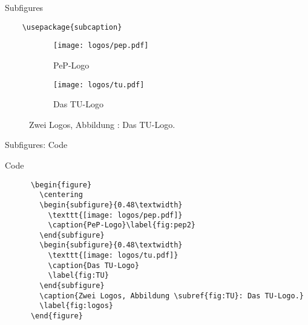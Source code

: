\begin{frame}[fragile]{Subfigures}
  \begin{Packages}
    \begin{lstlisting}
    \usepackage{subcaption}
    \end{lstlisting}
  \end{Packages}
      \begin{figure}
        \centering
        \begin{subfigure}{0.48\textwidth}
          \texttt{[image: logos/pep.pdf]}
          \caption{PeP-Logo}\label{fig:pep2}
        \end{subfigure}
        \begin{subfigure}{0.48\textwidth}
          \texttt{[image: logos/tu.pdf]}
          \caption{Das TU-Logo}\label{fig:TU}
        \end{subfigure}
        \caption{Zwei Logos, Abbildung : Das TU-Logo.}\label{fig:logos}
      \end{figure}
\end{frame}

\begin{frame}[fragile]{Subfigures: Code}
  \begin{block}{Code}
    \begin{lstlisting}
      \begin{figure}
        \centering
        \begin{subfigure}{0.48\textwidth}
          \texttt{[image: logos/pep.pdf]}
          \caption{PeP-Logo}\label{fig:pep2}
        \end{subfigure}
        \begin{subfigure}{0.48\textwidth}
          \texttt{[image: logos/tu.pdf]}
          \caption{Das TU-Logo}
          \label{fig:TU}
        \end{subfigure}
        \caption{Zwei Logos, Abbildung \subref{fig:TU}: Das TU-Logo.}
        \label{fig:logos}
      \end{figure}
    \end{lstlisting}
  \end{block}
\end{frame}

